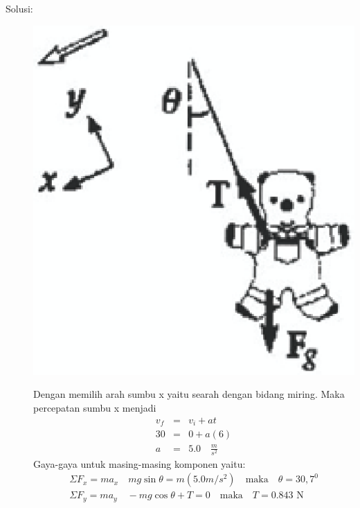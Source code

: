 \begin{description}
    \item[Solusi:]
        \mbox{}
\begin{center}
\includegraphics [scale=0.3]{./latex/eps/1_5_7_image_2.eps}
\end{center}
Dengan memilih arah sumbu x yaitu searah dengan bidang miring. Maka percepatan sumbu x menjadi
\begin{eqnarray*}
v_{f}&=&v_{i}+at \\
30 &=&0 + a(6) \\
a&=&5.0 \quad \textrm{$\frac{m}{s^{2}}$}
\end{eqnarray*}
Gaya-gaya untuk masing-masing komponen yaitu:
\begin{eqnarray*}
\Sigma F_{x}=ma_{x} \quad mg\sin\theta=m(5.0 m/s^{2}) \quad \textrm{maka} \quad \theta=30,7^{0} \\
\Sigma F_{y}=ma_{y} \quad -mg\cos\theta+T=0 \quad \textrm{maka} \quad T=0.843 \textrm{ N}
\end{eqnarray*}

\end{description}


